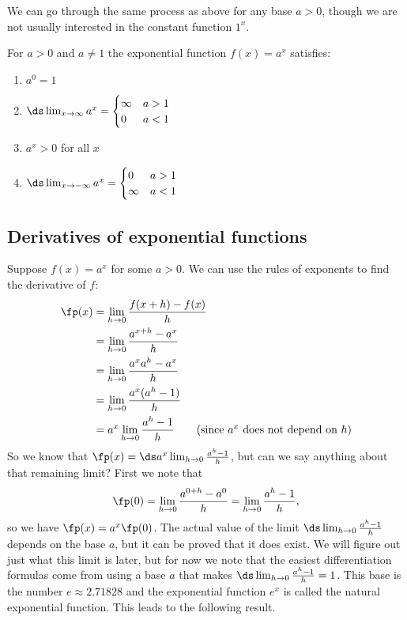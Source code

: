 We can go through the same process as above for any base $a>0$, though we are not usually interested in the constant function $1^x$.

\begin{keyidea}\label{ki_exp_func_props}%
For $a>0$ and $a\neq1$ the exponential function $f(x)=a^x$ satisfies:
\begin{multicols}{2}
\begin{enumerate}
 \item $a^0=1$
 \item $\ds\lim_{x\to\infty}a^x=\begin{cases}\infty&a>1\\0&a<1\end{cases}$
 \item $a^x>0$ for all $x$
 \item $\ds\lim_{x\to-\infty}a^x=\begin{cases}0&a>1\\\infty&a<1\end{cases}$
\end{enumerate}
\end{multicols}
\end{keyidea}

\subsection{Derivatives of exponential functions}

Suppose $f(x)=a^x$ for some $a>0$. We can use the rules of exponents to find the derivative of $f$:
\begin{align*}
	\fp(x)
	&=\lim_{h\to 0}\frac{f(x+h)-f(x)}{h}\\
	&=\lim_{h\to 0}\frac{a^{x+h}-a^x}{h}\\
	&=\lim_{h\to 0}\frac{a^xa^h-a^x}{h}\\
	&=\lim_{h\to 0}\frac{a^x(a^h-1)}{h}\\
	&=a^x\lim_{h\to 0}\frac{a^h-1}{h} \qquad\text{(since $a^x$ does not depend on $h$)}\\
\end{align*}
So we know that $\fp(x)=\ds a^x \lim_{h\to 0}\frac{a^h-1}{h}$, but can we say anything about that remaining limit? First we note that
\[\fp(0)=\lim_{h\to 0}\frac  {a^{0+h}-a^0}{h}=\lim_{h\to 0}\frac{a^h-1}{h},\]
so we have $\fp(x)=a^x\fp(0)$. The actual value of the limit $\ds\lim_{h\to 0}\frac{a^h-1}{h}$ depends on the base $a$, but it can be proved that it does exist. We will figure out just what this limit is later, but for now we note that the easiest differentiation formulas come from using a base $a$ that makes $\ds\lim_{h\to 0}\frac{a^h-1}{h}=1$. This base is the
number $e\approx 2.71828$ and the exponential function $e^x$ is called the natural exponential function. This leads to the following result.

